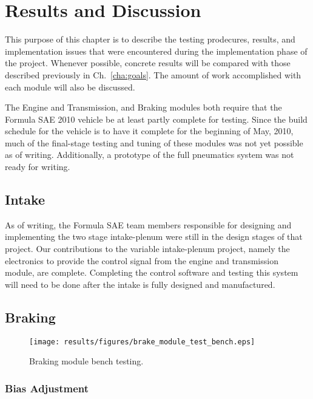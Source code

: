 \chapter{Results and Discussion}

This purpose of this chapter is to describe the testing prodecures, results, and implementation issues that were encountered during the implementation phase of the project. Whenever possible, concrete results will be compared with those described previously in Ch.\ \ref{cha:goals}. The amount of work accomplished with each module will also be discussed.

The Engine and Transmission, and Braking modules both require that the Formula SAE 2010 vehicle be at least partly complete for testing. Since the build schedule for the vehicle is to have it complete for the beginning of May, 2010, much of the final-stage testing and tuning of these modules was not yet possible as of writing. Additionally, a prototype of the full pneumatics system was not ready for writing.



\section{Intake}

As of writing, the Formula SAE team members responsible for designing and implementing the two stage intake-plenum were still in the design stages of that project. Our contributions to the variable intake-plenum project, namely the electronics to provide the control signal from the engine and transmission module, are complete. Completing the control software and testing this system will need to be done after the intake is fully designed and manufactured.

\section{Braking}

\begin{figure}[htp]
 \centering
 \texttt{[image: results/figures/brake\_module\_test\_bench.eps]}
 \caption{Braking module bench testing.}
 \label{fig:brake_module_bench_test}
\end{figure}


\subsection{Bias Adjustment}


